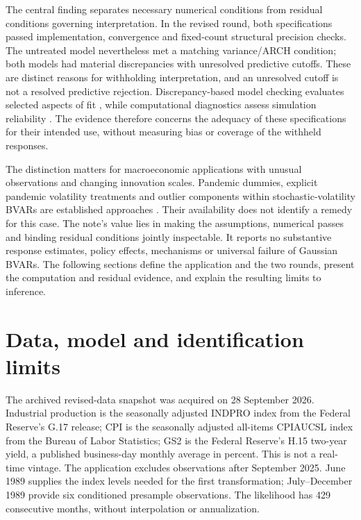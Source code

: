 \documentclass[11pt,a4paper]{article}
\begin{document}
The central finding separates necessary numerical conditions from residual conditions governing interpretation. In the revised round, both specifications passed implementation, convergence and fixed-count structural precision checks. The untreated model nevertheless met a matching variance/ARCH condition; both models had material discrepancies with unresolved predictive cutoffs. These are distinct reasons for withholding interpretation, and an unresolved cutoff is not a resolved predictive rejection. Discrepancy-based model checking evaluates selected aspects of fit \cite{gms1996}, while computational diagnostics assess simulation reliability \cite{vehtari2021}. The evidence therefore concerns the adequacy of these specifications for their intended use, without measuring bias or coverage of the withheld responses.

The distinction matters for macroeconomic applications with unusual observations and changing innovation scales. Pandemic dummies, explicit pandemic volatility treatments and outlier components within stochastic-volatility BVARs are established approaches \cite{cg2022,lp2022,ccmm2024}. Their availability does not identify a remedy for this case. The note's value lies in making the assumptions, numerical passes and binding residual conditions jointly inspectable. It reports no substantive response estimates, policy effects, mechanisms or universal failure of Gaussian BVARs. The following sections define the application and the two rounds, present the computation and residual evidence, and explain the resulting limits to inference.

\section{Data, model and identification limits}
The archived revised-data snapshot was acquired on 28 September 2026. Industrial production is the seasonally adjusted INDPRO index from the Federal Reserve's G.17 release; CPI is the seasonally adjusted all-items CPIAUCSL index from the Bureau of Labor Statistics; GS2 is the Federal Reserve's H.15 two-year yield, a published business-day monthly average in percent. This is not a real-time vintage. The application excludes observations after September 2025. June 1989 supplies the index levels needed for the first transformation; July--December 1989 provide six conditioned presample observations. The likelihood has 429 consecutive months, without interpolation or annualization.
\end{document}
